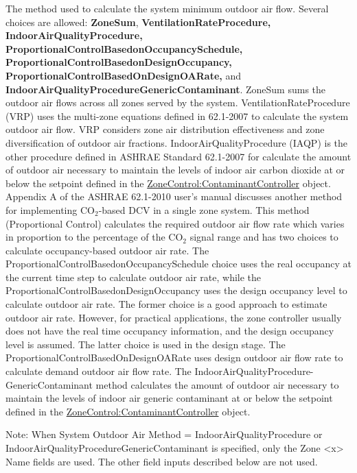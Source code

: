 The method used to calculate the system minimum outdoor air flow. Several choices are allowed: \textbf{ZoneSum}, \textbf{VentilationRateProcedure,} \textbf{IndoorAirQualityProcedure, ProportionalControlBasedonOccupancySchedule,} \textbf{ProportionalControlBasedonDesignOccupancy,} \textbf{ProportionalControlBasedOnDesignOARate,} and \textbf{IndoorAirQualityProcedureGenericContaminant}. ZoneSum sums the outdoor air flows across all zones served by the system. VentilationRateProcedure (VRP) uses the multi-zone equations defined in 62.1-2007 to calculate the system outdoor air flow. VRP considers zone air distribution effectiveness and zone diversification of outdoor air fractions. IndoorAirQualityProcedure (IAQP) is the other procedure defined in ASHRAE Standard 62.1-2007 for calculate the amount of outdoor air necessary to maintain the levels of indoor air carbon dioxide at or below the setpoint defined in the \hyperref[zonecontrolcontaminantcontroller]{ZoneControl:ContaminantController} object. Appendix A of the ASHRAE 62.1-2010 user's manual discusses another method for implementing CO\(_{2}\)-based DCV in a single zone system. This method (Proportional Control) calculates the required outdoor air flow rate which varies in proportion to the percentage of the CO\(_{2}\) signal range and has two choices to calculate occupancy-based outdoor air rate. The ProportionalControlBasedonOccupancySchedule choice uses the real occupancy at the current time step to calculate outdoor air rate, while the ProportionalControlBasedonDesignOccupancy uses the design occupancy level to calculate outdoor air rate. The former choice is a good approach to estimate outdoor air rate. However, for practical applications, the zone controller usually does not have the real time occupancy information, and the design occupancy level is assumed. The latter choice is used in the design stage. The ProportionalControlBasedOnDesignOARate uses design outdoor air flow rate to calculate demand outdoor air flow rate. The IndoorAirQualityProcedure-GenericContaminant method calculates the amount of outdoor air necessary to maintain the levels of indoor air generic contaminant at or below the setpoint defined in the \hyperref[zonecontrolcontaminantcontroller]{ZoneControl:ContaminantController} object.

Note: When System Outdoor Air Method = IndoorAirQualityProcedure or IndoorAirQualityProcedureGenericContaminant is specified, only the Zone \textless{}x\textgreater{} Name fields are used. The other field inputs described below are not used.

